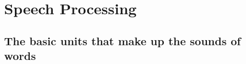 \chapter{Speech Processing}\label{ch:speech_processing}

\section{The basic units that make up the sounds of words}

